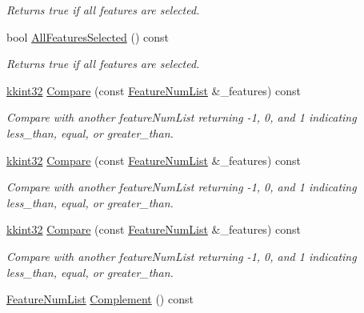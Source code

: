 \begin{DoxyCompactItemize}
\begin{DoxyCompactList}\small\item\em Returns true if all features are selected. \end{DoxyCompactList}\item 
bool \hyperlink{class_k_k_m_l_l_1_1_feature_num_list_a97fefd39955fda88d2ab3b36ba5ac0b4}{All\+Features\+Selected} () const 
\begin{DoxyCompactList}\small\item\em Returns true if all features are selected. \end{DoxyCompactList}\item 
\hyperlink{namespace_k_k_b_a8fa4952cc84fda1de4bec1fbdd8d5b1b}{kkint32} \hyperlink{class_k_k_m_l_l_1_1_feature_num_list_a2a7021665ec33a938e57b1c85aa65960}{Compare} (const \hyperlink{class_k_k_m_l_l_1_1_feature_num_list}{Feature\+Num\+List} \&\+\_\+features) const 
\begin{DoxyCompactList}\small\item\em Compare with another feature\+Num\+List returning -\/1, 0, and 1 indicating less\+\_\+than, equal, or greater\+\_\+than. \end{DoxyCompactList}\item 
\hyperlink{namespace_k_k_b_a8fa4952cc84fda1de4bec1fbdd8d5b1b}{kkint32} \hyperlink{class_k_k_m_l_l_1_1_feature_num_list_ad23cf33a7adc161505f46ab8ef08e4ae}{Compare} (const \hyperlink{class_k_k_m_l_l_1_1_feature_num_list}{Feature\+Num\+List} \&\+\_\+features) const 
\begin{DoxyCompactList}\small\item\em Compare with another feature\+Num\+List returning -\/1, 0, and 1 indicating less\+\_\+than, equal, or greater\+\_\+than. \end{DoxyCompactList}\item 
\hyperlink{namespace_k_k_b_a8fa4952cc84fda1de4bec1fbdd8d5b1b}{kkint32} \hyperlink{class_k_k_m_l_l_1_1_feature_num_list_a2a7021665ec33a938e57b1c85aa65960}{Compare} (const \hyperlink{class_k_k_m_l_l_1_1_feature_num_list}{Feature\+Num\+List} \&\+\_\+features) const 
\begin{DoxyCompactList}\small\item\em Compare with another feature\+Num\+List returning -\/1, 0, and 1 indicating less\+\_\+than, equal, or greater\+\_\+than. \end{DoxyCompactList}\item 
\hyperlink{class_k_k_m_l_l_1_1_feature_num_list}{Feature\+Num\+List} \hyperlink{class_k_k_m_l_l_1_1_feature_num_list_a14512fe30f9e99df084457a6f6e94d76}{Complement} () const 

\end{DoxyCompactItemize}

